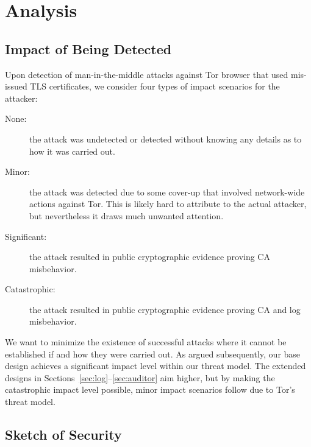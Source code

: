 \section{Analysis} \label{sec:analysis}

\subsection{Impact of Being Detected} \label{sec:analysis:impact}
Upon detection of man-in-the-middle attacks against Tor browser that used 
mis-issued TLS certificates, we consider four types of impact scenarios for the
attacker:
\begin{description}
	\item[None:] the attack was undetected or detected without knowing any
		details as to how it was carried out.
	\item[Minor:] the attack was detected due to some cover-up that involved
		network-wide actions against Tor.  This is likely hard to attribute to
		the actual attacker, but nevertheless it draws much unwanted attention.
	\item[Significant:] the attack resulted in public cryptographic evidence
		proving CA misbehavior.
	\item[Catastrophic:] the attack resulted in public cryptographic evidence
		proving CA and log misbehavior.
\end{description}

We want to minimize the existence of successful attacks where it cannot be
established if and how they were carried out.  As argued subsequently, our
base design achieves a significant impact level within our threat model.  The
extended designs in Sections~\ref{sec:log}--\ref{sec:auditor} aim higher, but by
making the catastrophic impact level possible, minor impact scenarios follow due
to Tor's threat model.

\subsection{Sketch of Security}
